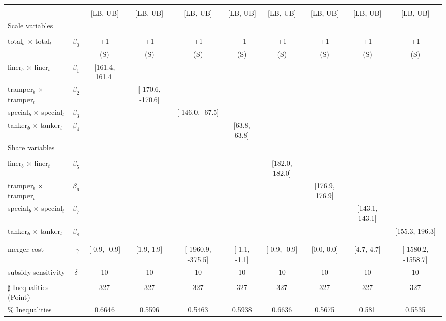 \begin{tabular}{@{\extracolsep{5pt}}lccccccccc}
\toprule 
 &  &  &  &  &  &  &  &  &  \\
 &  & [LB, UB] & [LB, UB] & [LB, UB] & [LB, UB] & [LB, UB] & [LB, UB] & [LB, UB] & [LB, UB] \\
\midrule 
Scale variables &  &  &  &  &  &  &  \\
 &  &  &  &  &  &  &  &  \\
total$_{b}$ $\times$ total$_{t}$ & $\beta_0$ & +1 & +1 & +1 & +1 & +1 & +1 & +1 & +1 \\
 &  & (S) & (S) & (S) & (S) & (S) & (S) & (S) & (S) \\
liner$_{b}$ $\times$ liner$_{t}$ & $\beta_1$ & [161.4, 161.4] &  &  &  &  &  &  &  \\
tramper$_{b}$ $\times$ tramper$_{t}$ & $\beta_2$ &  & [-170.6, -170.6] &  &  &  &  &  &  \\
special$_{b}$ $\times$ special$_{t}$ & $\beta_3$ &  &  & [-146.0, -67.5] &  &  &  &  &  \\
tanker$_{b}$ $\times$ tanker$_{t}$ & $\beta_4$ &  &  &  & [63.8, 63.8] &  &  &  &  \\
Share variables &  &  &  &  &  &  &  &  &  \\
 &  &  &  &  &  &  &  &  &  \\
liner$_{b}$ $\times$ liner$_{t}$ & $\beta_5$ &  &  &  &  & [182.0, 182.0] &  &  &  \\
tramper$_{b}$ $\times$ tramper$_{t}$ & $\beta_6$ &  &  &  &  &  & [176.9, 176.9] &  &  \\
special$_{b}$ $\times$ special$_{t}$ & $\beta_7$ &  &  &  &  &  &  & [143.1, 143.1] &  \\
tanker$_{b}$ $\times$ tanker$_{t}$ & $\beta_8$ &  &  &  &  &  &  &  & [155.3, 196.3] \\
 &  &  &  &  &  &  &  &  &  \\
 &  &  &  &  &  &  &  &  &  \\
merger cost & -$\gamma$ & [-0.9, -0.9] & [1.9, 1.9] & [-1960.9, -375.5] & [-1.1, -1.1] & [-0.9, -0.9] & [0.0, 0.0] & [4.7, 4.7] & [-1580.2, -1558.7] \\
subsidy sensitivity & $\delta$ & 10 & 10 & 10 & 10 & 10 & 10 & 10 & 10 \\
 &  &  &  &  &  &  &  &  &  \\
\hline 
$\sharp$ Inequalities (Point) &  & 327 & 327 & 327 & 327 & 327 & 327 & 327 & 327 \\
\% Inequalities &  & 0.6646 & 0.5596 & 0.5463 & 0.5938 & 0.6636 & 0.5675 & 0.581 & 0.5535 \\
\bottomrule 
\end{tabular}

